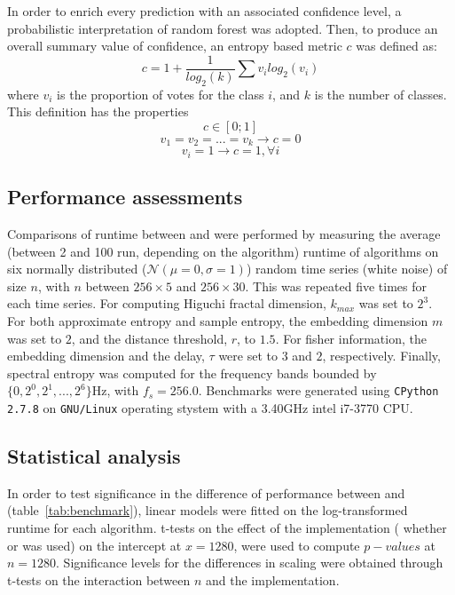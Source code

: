 In order to enrich every prediction with an associated confidence level, a probabilistic interpretation of random forest was adopted\citationneeded{}.
Then, to produce an overall summary value of confidence, an entropy based metric $c$ was defined as:
\begin{equation}
c = 1 + \frac{1}{log_2(k)}\sum{v_i  log_2(v_i)}
\label{eq:entropy}
\end{equation}
where $v_i$ is the proportion of votes for the class $i$, and $k$ is the number of classes. This definition has the properties 
\[
c \in [0;1]
\]
\[
v_1 = v_2 = ... = v_k \rightarrow c = 0
\]
\[
v_i = 1 \rightarrow c = 1 , \forall i
\]




\subsection{Performance assessments}
Comparisons of runtime between \pr{} and \pyeeg{} were performed by measuring the average (between 2 and 100 run, depending on the algorithm) runtime of algorithms on six
normally distributed ($\mathcal{N}(\mu=0,\sigma=1)$) random time series (\ie white noise) of size $n$,
with $n$ between $256 \times{} 5$ and $256 \times{} 30$.
This was repeated five times for each time series.
For computing  Higuchi fractal dimension, $k_{max}$ was set to $2^3$.
For both approximate entropy and sample entropy, the embedding dimension $m$ was set to $2$, and the distance threshold, $r$, to $1.5$.
For fisher information, the embedding dimension and the delay, $\tau$ were set to $3$ and $2$, respectively.
Finally, spectral entropy was computed for the frequency bands bounded by $\{0, 2^0, 2^1, ..., 2^6\}$Hz, with $f_s = 256.0$.
Benchmarks were generated using \texttt{CPython 2.7.8} on \texttt{GNU/Linux} operating stystem with a 3.40GHz intel i7-3770 CPU.

\subsection{Statistical analysis}
In order to test significance in the difference of performance between \pr{} and \pyeeg{} (table~\ref{tab:benchmark}),
linear models were fitted on the log-transformed runtime for each algorithm. 
t-tests on the effect of the implementation (\ie{} whether \pr{} or \pyeeg{} was used) on the intercept at $x=1280$, were used to compute $p-values$ at $n=1280$.
Significance levels for the differences in scaling were obtained through t-tests on the interaction between $n$ and the implementation.


